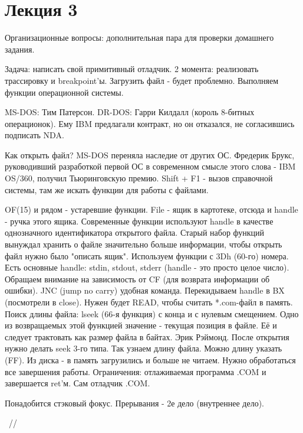 \section{Лекция 3}
Организационные вопросы: дополнительная пара для проверки домашнего задания. 
\begin{hw}Задача: написать свой примитивный отладчик. 2 момента: реализовать трассировку и breakpoint'ы. Загрузить файл - будет проблемно. Выполняем функции операционной системы. 
\end{hw}
\begin{rem}
MS-DOS: Тим Патерсон.
DR-DOS: Гарри Килдалл (король 8-битных операционок). Ему IBM предлагали контракт, но он отказался, не согласившись подписать NDA.\end{rem}

Как открыть файл? MS-DOS переняла наследие от других ОС. Фредерик Брукс, руководивший разработкой первой ОС в современном смысле этого слова - IBM OS/360, получил Тьюринговскую премию. Shift + F1 - вызов справочной системы, там же искать функции для работы с файлами. 

OF(15) и рядом - устаревшие функции. File - ящик в картотеке, отсюда и handle - ручка этого ящика. Современные функции используют handle в качестве однозначного идентификатора открытого файла. Старый набор функций вынуждал хранить о файле значительно больше информации, чтобы открыть файл нужно было "описать ящик". Используем функции с 3Dh (60-го) номера. Есть основные handle: stdin, stdout, stderr (handle - это просто целое число). Обращаем внимание на зависимость от CF (для возврата информации об ошибки). JNC (jump no carry) удобная команда. Перекидываем handle в BX (посмотрели в close). Нужен будет READ, чтобы считать *.com-файл в память. Поиск длины файла: lseek (66-я функция) с конца и с нулевым смещением. Одно из возвращаемых этой функцией значение - текущая позиция в файле. Её и следует трактовать как размер файла в байтах. Эрик Рэймонд. После открытия нужно делать seek 3-го типа. Так узнаем длину файла. Можно длину указать (FF). Из диска - в память загрузились и больше не читаем. Нужно обработаться все завершения работы.
Ограничения: отлаживаемая программа .COM и завершается ret'м. Сам отладчик .COM.

Понадобится стэковый фокус. Прерывания - 2е дело (внутреннее дело). 

~//

